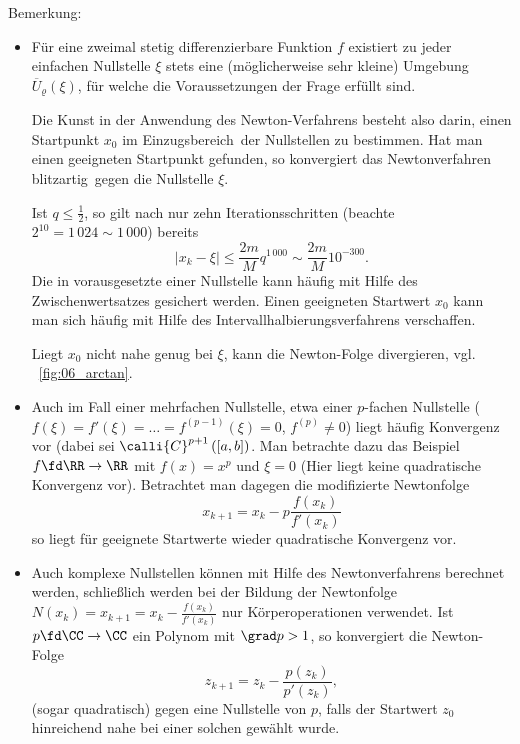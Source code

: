 \begin{antwort}
  \medskip
  \noindent
  Bemerkung: 
  \begin{itemize}
    \item Für eine zweimal stetig differenzierbare Funktion $f$ 
      existiert zu jeder einfachen Nullstelle $\xi$ stets eine 
      (möglicherweise sehr kleine) Umgebung $\overline{U}_\varrho(\xi)$, für 
      welche die Voraussetzungen der Frage erfüllt sind.
      
      Die Kunst in der Anwendung des Newton-Verfahrens besteht also darin, 
      einen Startpunkt $x_0$ im \glqq Einzugsbereich\grqq\ der Nullstellen
      zu bestimmen. Hat man einen geeigneten Startpunkt gefunden, so 
      konvergiert das Newtonverfahren \glqq blitzartig\grqq\ gegen die 
      Nullstelle $\xi$.

      Ist $q\le \frac12$, so gilt \zB nach nur zehn Iterationsschritten 
      (beachte $2^{10} = 1\,024 \sim 1\,000$) bereits
      \[
      \left| x_k-\xi \right| \le \frac{2m}{M} q^{1\,000} \sim 
      \frac{2m}{M} 10^{-300}.
      \]
      Die in vorausgesetzte  einer 
      Nullstelle kann häufig mit Hilfe des Zwischenwertsatzes gesichert werden. 
      Einen geeigneten Startwert $x_0$ kann man sich häufig mit Hilfe des 
      Intervallhalbierungsverfahrens verschaffen. 

      Liegt $x_0$ nicht nahe genug bei $\xi$, kann die Newton-Folge divergieren, 
      vgl. \Abb~\ref{fig:06_arctan}.
    \item Auch im Fall einer mehrfachen Nullstelle, etwa einer $p$-fachen Nullstelle 
      ($f(\xi)=f'(\xi)=\ldots=f^{(p-1)}(\xi) = 0$, $f^{(p)} \not=0$) 
      liegt häufig Konvergenz vor (dabei sei $\calli{C}^{p+1} \left([a,b]\right)$. 
      Man betrachte dazu das Beispiel $f\fd \RR\to\RR$ mit $f(x)=x^p$ und $\xi=0$ 
      (Hier liegt keine quadratische Konvergenz vor). 
      Betrachtet man dagegen die modifizierte Newtonfolge 
      \[
      x_{k+1} = x_k - p \frac{f(x_k)}{f'(x_k)}
      \]
      so liegt für geeignete Startwerte wieder quadratische Konvergenz vor. 
    \item Auch komplexe Nullstellen können mit Hilfe des Newtonverfahrens 
      berechnet werden, schließlich werden bei der Bildung der Newtonfolge 
      $N(x_k) = x_{k+1} = x_k - \frac{f(x_k)}{f'(x_k)}$ nur 
      Körperoperationen verwendet. 
      Ist \zB\ $p\fd\CC\to\CC$ ein Polynom mit $\grad p > 1$, so konvergiert 
      die Newton-Folge
      \[
      z_{k+1} = z_k - \frac{p(z_k)}{p'(z_k)}, 
      \]
      (sogar quadratisch) gegen eine Nullstelle von $p$, falls der 
      Startwert $z_0$ hinreichend nahe bei einer solchen gewählt wurde.


\end{itemize}
\end{antwort}
